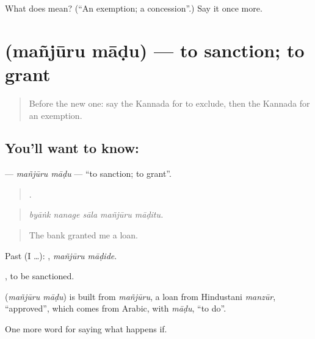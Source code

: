 \begin{tcolorbox}[breakable,colback=teal!4,colframe=teal!35!black,title={Before you move on}]
What does  mean? (\textquotedblleft{}An exemption; a concession\textquotedblright{}.) Say it once more.
\end{tcolorbox}
\section[\texorpdfstring{\kn{ಮಂಜೂರು} \kn{ಮಾಡು} (mañjūru māḍu)}{ಮಂಜೂರು ಮಾಡು (mañjūru māḍu)}]{  (mañjūru māḍu) — to sanction; to grant}

\label{lesson:KA-C415-manjuru-madu}



\begin{quote}
Before the new one: say the Kannada for to exclude, then the Kannada for an exemption.
\end{quote}

\subsection*{You'll want to know:  }
\textbf{ } — \emph{mañjūru māḍu} — \textquotedblleft{}to sanction; to grant\textquotedblright{}.

\begin{quote}
    .
\end{quote}

\begin{quote}
\emph{byāṅk nanage sāla mañjūru māḍitu.}
\end{quote}

\begin{quote}
The bank granted me a loan.
\end{quote}

Past (I …):  , \emph{mañjūru māḍide}.

, to be sanctioned.

\begin{cousinweb}
\textbf{ } (\emph{mañjūru māḍu}) is built from \emph{mañjūru}, a loan from Hindustani \emph{manzūr}, \textquotedblleft{}approved\textquotedblright{}, which comes from Arabic, with \emph{māḍu}, \textquotedblleft{}to do\textquotedblright{}.
\end{cousinweb}

\begin{grammarlens}[title={What you've built}]
One more word for saying what happens if.
\end{grammarlens}

